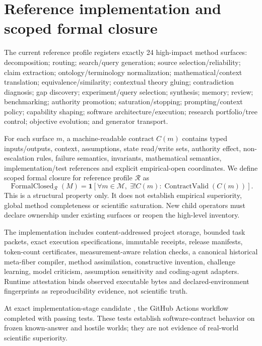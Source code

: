 \section{Reference implementation and scoped formal closure}
The current reference profile registers exactly 24 high-impact method surfaces: decomposition; routing; search/query generation; source selection/reliability; claim extraction; ontology/terminology normalization; mathematical/context translation; equivalence/similarity; contextual theory gluing; contradiction diagnosis; gap discovery; experiment/query selection; synthesis; memory; review; benchmarking; authority promotion; saturation/stopping; prompting/context policy; capability shaping; software architecture/execution; research portfolio/tree control; objective evolution; and generator transport.

For each surface $m$, a machine-readable contract $C(m)$ contains typed inputs/outputs, context, assumptions, state read/write sets, authority effect, non-escalation rules, failure semantics, invariants, mathematical semantics, implementation/test references and explicit empirical-open coordinates. We define scoped formal closure for reference profile $\mathcal R$ as
\begin{equation}\operatorname{FormalClosed}_{\mathcal R}(M)=\mathbf 1\!\left[\forall m\in\mathcal M,\;\exists!C(m):\operatorname{ContractValid}(C(m))\right].\end{equation}
This is a structural property only. It does not establish empirical superiority, global method completeness or scientific saturation. New child operators must declare ownership under existing surfaces or reopen the high-level inventory.

The implementation includes content-addressed project storage, bounded task packets, exact execution specifications, immutable receipts, release manifests, token-count certificates, measurement-aware relation checks, a canonical historical meta-fiber compiler, method assimilation, constructive invention, challenge learning, model criticism, assumption sensitivity and coding-agent adapters. Runtime attestation binds observed executable bytes and declared-environment fingerprints as reproducibility evidence, not scientific truth.

At exact implementation-stage candidate \ImplementationSHA{}, the GitHub Actions workflow completed with \SoftwareTests{} passing tests. These tests establish software-contract behavior on frozen known-answer and hostile worlds; they are not evidence of real-world scientific superiority.

